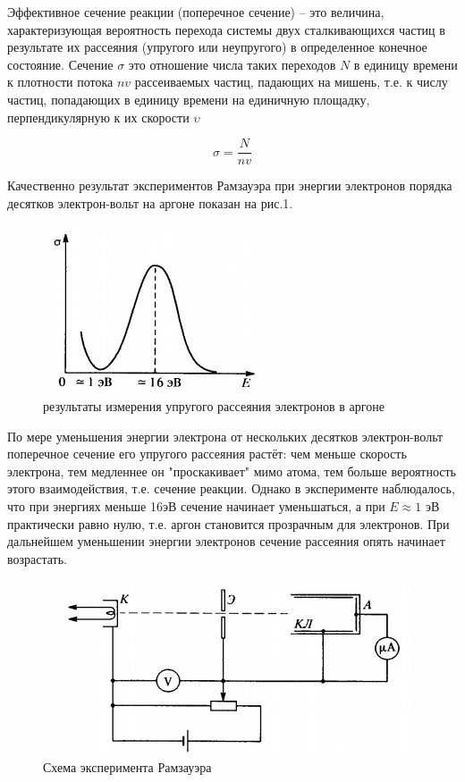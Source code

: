 \documentclass[a4paper,12pt]{article}
\begin{document}
    Эффективное сечение реакции (поперечное сечение) -- это величина, характеризующая вероятность перехода
    системы двух сталкивающихся частиц в результате их рассеяния (упругого или
    неупругого) в определенное конечное состояние. Сечение $\sigma$ это отношение
    числа таких переходов $N$ в единицу времени к плотности потока $nv$ рассеиваемых
    частиц, падающих на мишень, т.е. к числу частиц, попадающих в единицу времени
    на единичную площадку, перпендикулярную к их скорости $\upsilon$

    \begin{equation}
    \sigma = \frac{N}{nv}
    \end{equation}


    Качественно результат экспериментов Рамзауэра при энергии электронов порядка десятков
    электрон-вольт на аргоне показан на рис.1. 

    \begin{figure}[h!]
        \begin{center}
            \includegraphics[width=0.5\linewidth]{2020-12-10-1.jpg}
            \caption{результаты измерения упругого рассеяния электронов в аргоне}
        \end{center}
    \end{figure}
    \pagebreak
    
    По мере уменьшения энергии электрона от нескольких
    десятков электрон-вольт поперечное сечение его упругого рассеяния растёт: чем меньше скорость
    электрона, тем медленнее он "проскакивает" мимо атома, тем больше вероятность этого
    взаимодействия, т.е. сечение реакции. Однако в эксперименте наблюдалось, что при
    энергиях меньше 16эВ сечение начинает уменьшаться, а при $E\approx 1$ эВ практически
    равно нулю, т.е. аргон становится прозрачным для электронов. При дальнейшем уменьшении
    энергии электронов сечение рассеяния опять начинает возрастать.

    \begin{figure}[h!]
        \begin{center}
            \includegraphics[width=0.5\linewidth]{2020-12-10-2.jpg}
            \caption{Схема эксперимента Рамзауэра}
        \end{center}
    \end{figure}
    \pagebreak

    
\end{document}
